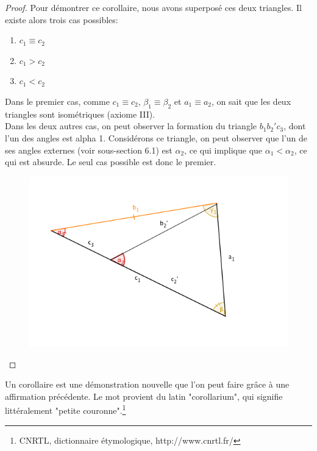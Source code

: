 \documentclass[a4paper,12pt]{article}
\begin{document}
\begin{proof}
Pour démontrer ce corollaire, nous avons superposé ces deux triangles. Il existe alors trois cas possibles:
\begin{enumerate}
    \item $c_1 \equiv c_2$
    \item $c_1 > c_2$
    \item $c_1 < c_2$
\end{enumerate}
Dans le premier cas, comme $c_1 \equiv c_2$, $\beta_1 \equiv \beta_2$ et $a_1 \equiv a_2$, on sait que les deux triangles sont isométriques (axiome III).\\
Dans les deux autres cas, on peut observer la formation du triangle $b_1b_2'c_3$, dont l'un des angles est alpha 1. Considérons ce triangle, on peut observer que l'un de ses angles externes (voir sous-section 6.1) est $\alpha_2$, ce qui implique que $\alpha_1 < \alpha_2$, ce qui est absurde. Le seul cas possible est donc le premier.
\begin{figure}[H]
    \centering
    \includegraphics[scale=0.6]{schema/Corrolaire2.png}
\end{figure}
\end{proof}

\begin{remark}
Un corollaire est une démonstration nouvelle que l'on peut faire grâce à une affirmation précédente. Le mot provient du latin "corollarium", qui signifie littéralement "petite couronne".\footnote{CNRTL, dictionnaire étymologique, http://www.cnrtl.fr/}
\end{remark}
\end{document}

